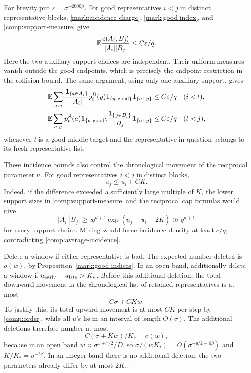 For brevity put \(\varepsilon=\sigma^{-2000\beta}\).
For good representatives \(i<j\) in distinct representative
blocks, \eqref{mark:incidence-charge},
\eqref{mark:good-index}, and \eqref{comp:support-measure} give
\begin{equation}\label{comp:average-incidence}
 \mathbb E\frac{e(A_i,B_j)}{|A_i||B_j|}
       \le C\varepsilon/q.
\end{equation}
Here the two auxiliary support choices are independent.
Their uniform measures vanish outside the good endpoints,
which is precisely the endpoint restriction in the collision
bound. The same argument, using only one auxiliary support,
gives
\begin{equation}\label{comp:target-incidence}
\begin{aligned}
 \mathbb E\sum_{a,y}
 \frac{\boldsymbol 1_{\{a\in A_i\}}}{|A_i|}
 p_t^B(y)\boldsymbol 1_{\{y\ {\rm good}\}}
 \boldsymbol 1_{\{a\perp y\}}&\le C\varepsilon/q
       &&(i<t),\\
 \mathbb E\sum_{a,y}
 p_t^A(a)\boldsymbol 1_{\{a\ {\rm good}\}}
 \frac{\boldsymbol 1_{\{y\in B_j\}}}{|B_j|}
 \boldsymbol 1_{\{a\perp y\}}&\le C\varepsilon/q
       &&(t<j),
\end{aligned}
\end{equation}
whenever \(t\) is a good middle target and the representative
in question belongs to its fresh representative list.

These incidence bounds also control the chronological movement
of the reciprocal parameter \(u\).
For good representatives \(i<j\) in distinct blocks,
\begin{equation}\label{comp:order}
 u_j\le u_i+CK.
\end{equation}
Indeed, if the difference exceeded a sufficiently large
multiple of \(K\), the lower support sizes in
\eqref{comp:support-measure} and the reciprocal cap formulas
would give
\[
 |A_i||B_j|\ge c q^{d+1}
                    \exp(u_j-u_i-2K)\gg q^{d+1}
\]
for every support choice. Mixing would force incidence
density at least \(c/q\), contradicting
\eqref{comp:average-incidence}.

Delete a window if either representative is bad.
The expected number deleted is \(o(w)\), by
Proposition~\ref{mark:good-indices}.
In an open band, additionally delete a window if
\(u_{\rm early}-u_{\rm late}>K_*\).
Before this additional deletion, the total downward movement
in the chronological list of retained representatives is at
most
\[
 C\sigma+CKw.
\]
To justify this, its total upward movement is at most \(CK\)
per step by \eqref{comp:order}, while all \(u\)'s lie in an
interval of length \(O(\sigma)\).
The additional deletions therefore number at most
\[
 C(\sigma+Kw)/K_*=o(w),
\]
because in an open band
\(w\asymp\sigma^{1+\eta/2}/D\), so
\(\sigma/(wK_*)=O(\sigma^{-\eta/2-6\beta})\) and
\(K/K_*=\sigma^{-3\beta}\).
In an integer band there is no additional deletion:
the two parameters already differ by at most \(2K_*\).

